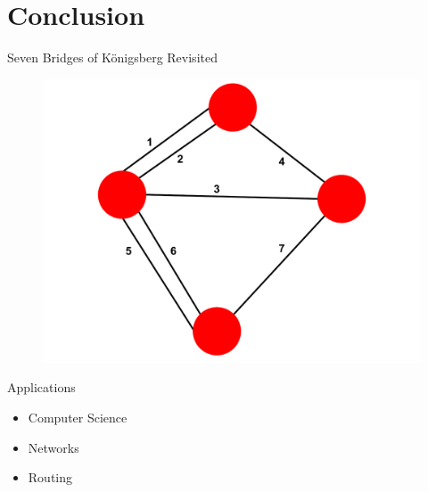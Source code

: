 \documentclass{beamer}
\begin{document}
\section{Conclusion}

\begin{frame}{Seven Bridges of K\"{o}nigsberg Revisited}
	\begin{figure}
		\centering
		\includegraphics[scale=.35]{pictures/konigsberg.pdf}
	\end{figure}
\end{frame}

\begin{frame}{Applications}
	\begin{itemize}
		\item<1-> Computer Science
		\item<2-> Networks
		\item<3-> Routing 
	\end{itemize}
\end{frame}

\end{document}
